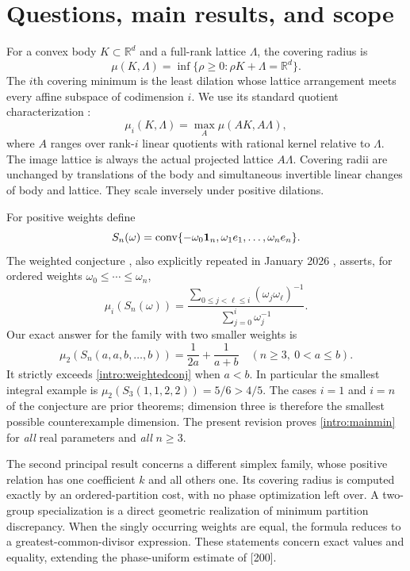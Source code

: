 \documentclass[11pt,a4paper]{article}
\theoremstyle{remark}\newtheorem{remark}[theorem]{Remark}
\DeclareMathOperator{\conv}{conv}
\newcommand{\R}{\mathbb R}\newcommand{\Z}{\mathbb Z}
\begin{document}
\section{Questions, main results, and scope}
For a convex body $K\subset\R^d$ and a full-rank lattice $\Lambda$,
the covering radius is
\[
 \mu(K,\Lambda)=\inf\{\rho\ge0:\rho K+\Lambda=\R^d\}.
\]
The $i$th covering minimum is the least dilation whose lattice
arrangement meets every affine subspace of codimension $i$.
We use its standard quotient characterization \cite[Section 1]{CSS}:
\begin{equation}\label{intro:quotient}
 \mu_i(K,\Lambda)=\max_A\mu(AK,A\Lambda),
\end{equation}
where $A$ ranges over rank-$i$ linear quotients with rational kernel
relative to $\Lambda$. The image lattice is always the actual
projected lattice $A\Lambda$. Covering radii are unchanged by
translations of the body and simultaneous invertible linear changes
of body and lattice. They scale inversely under positive dilations.

For positive weights define
\[
 S_n(\omega)=\conv\{-\omega_0\one_n,
                      \omega_1e_1,\ldots,\omega_ne_n\}.
\]
The weighted conjecture \cite[Conjecture 5.3]{CSS}, also explicitly
repeated in January 2026 \cite[Conjecture 5.3]{Krivokuca}, asserts,
for ordered weights $\omega_0\le\cdots\le\omega_n$,
\begin{equation}\label{intro:weightedconj}
 \mu_i(S_n(\omega))=
 \frac{\displaystyle\sum_{0\le j<\ell\le i}(\omega_j\omega_\ell)^{-1}}
      {\displaystyle\sum_{j=0}^i\omega_j^{-1}}.
\end{equation}
Our exact answer for the family with two smaller weights is
\begin{equation}\label{intro:mainmin}
 \boxed{\mu_2(S_n(a,a,b,\ldots,b))
       =\frac1{2a}+\frac1{a+b}\quad(n\ge3,\ 0<a\le b).}
\end{equation}
It strictly exceeds \eqref{intro:weightedconj} when $a<b$.
In particular the smallest integral example is
$\mu_2(S_3(1,1,2,2))=5/6>4/5$.
The cases $i=1$ and $i=n$ of the conjecture are prior theorems;
dimension three is therefore the smallest possible counterexample
dimension. The present revision proves \eqref{intro:mainmin} for
\emph{all} real parameters and \emph{all} $n\ge3$.

The second principal result concerns a different simplex family,
whose positive relation has one coefficient $k$ and all others one.
Its covering radius is computed exactly by an ordered-partition
cost, with no phase optimization left over. A two-group specialization
is a direct geometric realization of minimum partition discrepancy.
When the singly occurring weights are equal, the formula reduces to
a greatest-common-divisor expression. These statements concern exact
values and equality, extending the phase-uniform estimate of [200].
\end{document}
